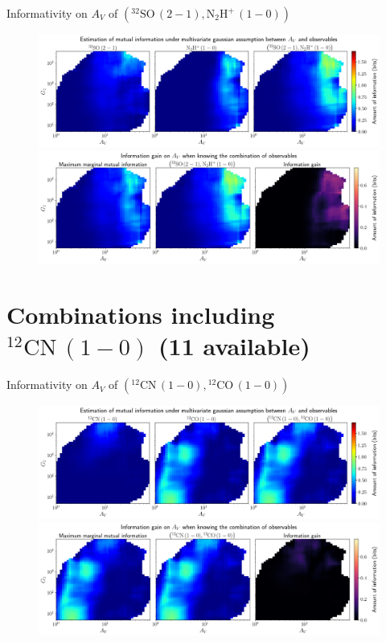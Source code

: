 \documentclass{beamer}
\begin{document}
\begin{frame}{Informativity on $A_V$ of $\left(\mathrm{^{32}SO\,(2-1)},\mathrm{N_2H^+\,(1-0)}\right)$}
    \begin{figure}
        \centering
        \includegraphics[width=0.95\linewidth]{../linearinfogauss/av__32so21_n2hp10_linearinfogauss.png}
        \vfill
        \includegraphics[width=0.95\linewidth]{../linearinfogauss/av__32so21_n2hp10_linearinfogauss_gain.png}
    \end{figure}
\end{frame}

\section{Combinations including $\mathrm{^{12}CN\,(1-0)}$ (11 available)}

\begin{frame}{Informativity on $A_V$ of $\left(\mathrm{^{12}CN\,(1-0)},\mathrm{^{12}CO\,(1-0)}\right)$}
    \begin{figure}
        \centering
        \includegraphics[width=0.95\linewidth]{../linearinfogauss/av__12cn10_12co10_linearinfogauss.png}
        \vfill
        \includegraphics[width=0.95\linewidth]{../linearinfogauss/av__12cn10_12co10_linearinfogauss_gain.png}
    \end{figure}
\end{frame}
\end{document}

